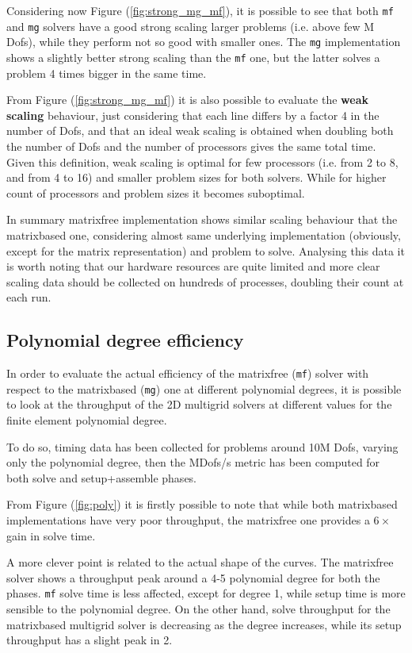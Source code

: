 \documentclass{article}
\begin{document}
Considering now Figure (\ref{fig:strong_mg_mf}),  it is possible to see that both \verb|mf| and \verb|mg| solvers have a good strong scaling larger problems (i.e. above few M Dofs), while they perform not so good with smaller ones. The \verb|mg| implementation shows a slightly better strong scaling than the \verb|mf| one, but the latter solves a problem 4 times bigger in the same time.

From Figure (\ref{fig:strong_mg_mf}) it is also possible to evaluate the \textbf{weak scaling} behaviour, just considering that each line differs by a factor 4 in the number of Dofs, and that an ideal weak scaling is obtained when doubling both the number of Dofs and the number of processors gives the same total time. Given this definition, weak scaling is optimal for few processors (i.e. from 2 to 8, and from 4 to 16) and smaller problem sizes for both solvers. While for higher count of processors and problem sizes it becomes suboptimal.

In summary matrixfree implementation shows similar scaling behaviour that the matrixbased one, considering almost same underlying implementation (obviously, except for the matrix representation) and problem to solve. Analysing this data it is worth noting that our hardware resources are quite limited and more clear scaling data should be collected on hundreds of processes, doubling their count at each run.


\subsection{Polynomial degree efficiency}
In order to evaluate the actual efficiency of the matrixfree (\verb|mf|) solver with respect to the matrixbased (\verb|mg|) one at different polynomial degrees, it is possible to look at the throughput of the 2D multigrid solvers at different values for the finite element polynomial degree.

To do so, timing data has been collected for problems around 10M Dofs, varying only the polynomial degree, then the MDofs/s metric has been computed for both solve and setup+assemble phases.

From Figure (\ref{fig:poly}) it is firstly possible to note that while both matrixbased implementations have very poor throughput, the matrixfree one provides a \(6\times\) gain in solve time.

A more clever point is related to the actual shape of the curves. The matrixfree solver shows a throughput peak around a 4-5 polynomial degree for both the phases. \verb|mf| solve time is less affected, except for degree 1, while setup time is more sensible to the polynomial degree.
On the other hand, solve throughput for the matrixbased multigrid solver is decreasing as the degree increases, while its setup throughput has a slight peak in 2.
\end{document}
